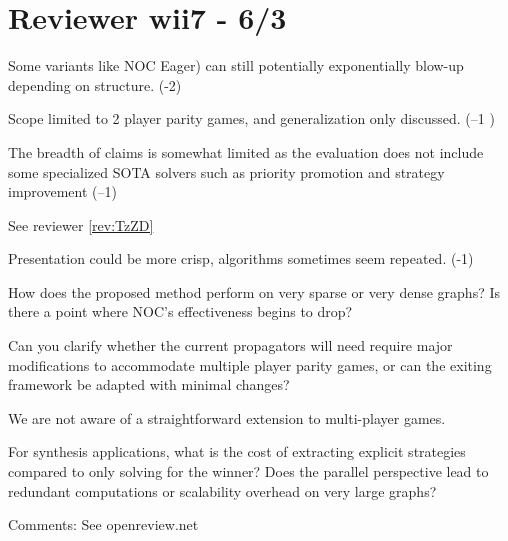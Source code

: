 \documentclass{article}
\begin{document}

\section{Reviewer wii7 - 6/3}

\begin{reviewer}
Some variants like NOC Eager) can still potentially exponentially blow-up depending on structure. (-2)
\end{reviewer}

\begin{reviewer}
Scope limited to 2 player parity games, and generalization only discussed. (–1 )
\end{reviewer}

\begin{reviewer}
The breadth of claims is somewhat limited as the evaluation does not include some specialized SOTA solvers such as priority promotion and strategy improvement (–1)
\end{reviewer}

See reviewer \ref{rev:TzZD}

\begin{reviewer}
Presentation could be more crisp, algorithms sometimes seem repeated. (-1)
\end{reviewer}

\begin{reviewer}
How does the proposed method perform on very sparse or very dense graphs? Is there a point where NOC's effectiveness begins to drop?
\end{reviewer}

\begin{reviewer}
Can you clarify whether the current propagators will need require major modifications to accommodate multiple player parity games, or can the exiting framework be adapted with minimal changes?
\end{reviewer}

We are not aware of a straightforward extension to multi-player games.

\begin{reviewer}
For synthesis applications, what is the cost of extracting explicit strategies compared to only solving for the winner? Does the parallel perspective lead to redundant computations or scalability overhead on very large graphs?
\end{reviewer}

\begin{reviewer}
Comments:
See openreview.net
\end{reviewer}
\end{document}
